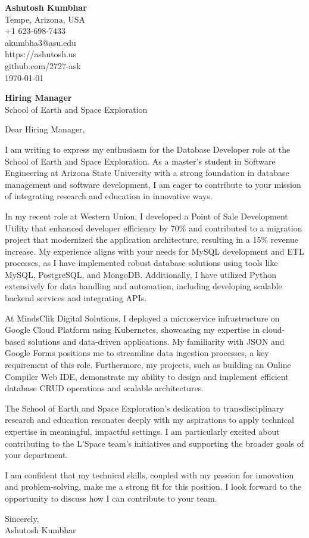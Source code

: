 \documentclass[11pt]{article}
\begin{document}
\begin{flushleft}
\textbf{Ashutosh Kumbhar} \\
Tempe, Arizona, USA \\
+1 623-698-7433 \\
akumbha3@asu.edu \\
https://ashutosh.us \\
github.com/2727-ask \\
\today
\end{flushleft}

\vspace{0.5em}

\textbf{Hiring Manager} \\
School of Earth and Space Exploration \\

\vspace{1em}

Dear Hiring Manager,

I am writing to express my enthusiasm for the Database Developer role at the School of Earth and Space Exploration. As a master's student in Software Engineering at Arizona State University with a strong foundation in database management and software development, I am eager to contribute to your mission of integrating research and education in innovative ways.

In my recent role at Western Union, I developed a Point of Sale Development Utility that enhanced developer efficiency by 70\% and contributed to a migration project that modernized the application architecture, resulting in a 15\% revenue increase. My experience aligns with your needs for MySQL development and ETL processes, as I have implemented robust database solutions using tools like MySQL, PostgreSQL, and MongoDB. Additionally, I have utilized Python extensively for data handling and automation, including developing scalable backend services and integrating APIs.

At MindsClik Digital Solutions, I deployed a microservice infrastructure on Google Cloud Platform using Kubernetes, showcasing my expertise in cloud-based solutions and data-driven applications. My familiarity with JSON and Google Forms positions me to streamline data ingestion processes, a key requirement of this role. Furthermore, my projects, such as building an Online Compiler Web IDE, demonstrate my ability to design and implement efficient database CRUD operations and scalable architectures.

The School of Earth and Space Exploration's dedication to transdisciplinary research and education resonates deeply with my aspirations to apply technical expertise in meaningful, impactful settings. I am particularly excited about contributing to the L’Space team’s initiatives and supporting the broader goals of your department.

I am confident that my technical skills, coupled with my passion for innovation and problem-solving, make me a strong fit for this position. I look forward to the opportunity to discuss how I can contribute to your team.

Sincerely, \\
Ashutosh Kumbhar
\end{document}
